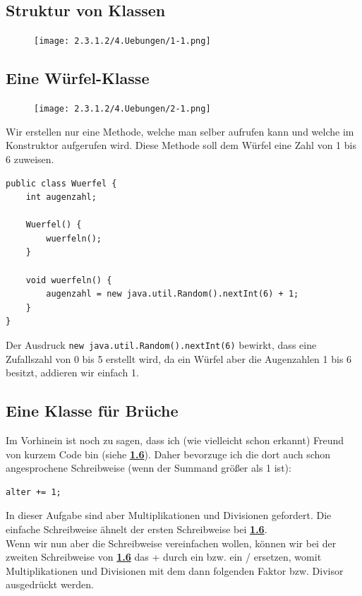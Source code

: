 \documentclass{scrartcl}   %
\begin{document}
\subsection{Struktur von Klassen}

\begin{figure}[ht]
	\centering
	\texttt{[image: 2.3.1.2/4.Uebungen/1-1.png]}
\end{figure}

\subsection{Eine Würfel-Klasse}

\begin{figure}[ht]
	\centering
	\texttt{[image: 2.3.1.2/4.Uebungen/2-1.png]}
\end{figure}

Wir erstellen nur eine Methode, welche man selber aufrufen kann und welche im Konstruktor aufgerufen wird. Diese Methode soll dem Würfel eine Zahl von 1 bis 6 zuweisen.

\newpage

\begin{lstlisting}
public class Wuerfel {
    int augenzahl;
    
    Wuerfel() {
        wuerfeln();
    }
    
    void wuerfeln() {
        augenzahl = new java.util.Random().nextInt(6) + 1;
    }
}
\end{lstlisting}

Der Ausdruck \texttt{new  java.util.Random().nextInt(6)} bewirkt, dass eine Zufallszahl von 0 bis 5 erstellt wird, da ein Würfel aber die Augenzahlen 1 bis 6 besitzt, addieren wir einfach 1.

\subsection{Eine Klasse für Brüche}

Im Vorhinein ist noch zu sagen, dass ich (wie vielleicht schon erkannt) Freund von kurzem Code bin (siehe \hyperlink{subsection.1.6}{\textbf{1.6}}). Daher bevorzuge ich die dort auch schon angesprochene Schreibweise (wenn der Summand größer als 1 ist):\\
\begin{lstlisting}
alter += 1;
\end{lstlisting}

In dieser Aufgabe sind aber Multiplikationen und Divisionen gefordert. Die einfache Schreibweise ähnelt der ersten Schreibweise bei \hyperlink{subsection.1.6}{\textbf{1.6}}.\\
Wenn wir nun aber die Schreibweise vereinfachen wollen, können wir bei der zweiten Schreibweise von \hyperlink{subsection.1.6}{\textbf{1.6}} das \glqq +\grqq{} durch ein \glqq *\grqq{} bzw. ein \glqq/\grqq{} ersetzen, womit Multiplikationen und Divisionen mit dem dann folgenden Faktor bzw. Divisor ausgedrückt werden.\\
\end{document}
